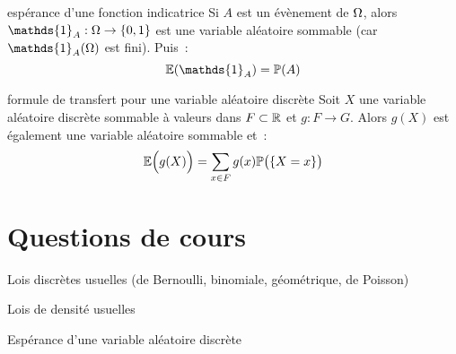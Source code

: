 \begin{exemple}{}{espérance d'une fonction indicatrice}
    Si $A$ est un évènement de $\Omega$, alors $\mathds{1}_A : \univ \to \{0, 1\}$ est une variable aléatoire sommable (car $\mathds{1}_A(\univ)$ est fini). Puis~:
    $$\mb{E}(\mathds{1}_A) = \proba(A)$$
\end{exemple}

\begin{theoreme}{}{formule de transfert pour une variable aléatoire discrète}
    Soit $X$ une variable aléatoire discrète sommable à valeurs dans $F \subset \mathbb{R}$ et $g : F \to G$. Alors $g(X)$ est également une variable aléatoire sommable et~:
    $$\mathbb{E}\Big(g(X)\Big) = \sum_{x \in F}g(x)\mathbb{P}\big(\{X = x\}\big)$$
\end{theoreme}






\section*{Questions de cours}

\begin{enumeratebf}
    \item Lois discrètes usuelles (de Bernoulli, binomiale, géométrique, de Poisson)
    \item Lois de densité usuelles 
    \item Espérance d'une variable aléatoire discrète
\end{enumeratebf}

